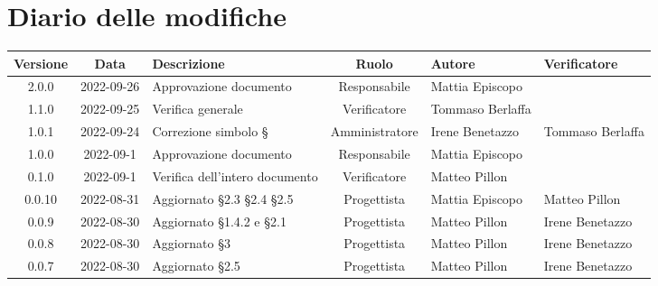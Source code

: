 \section*{Diario delle modifiche}
	\begin{center}
	\renewcommand{\arraystretch}{1.8} %
	\begin{longtable}{ |c|c|p{8em}|c|m{5em}|m{6em}| }
	\hline
	\textbf{Versione} & \textbf{Data} & \textbf{Descrizione} &  \textbf{Ruolo} &  \textbf{Autore} & \textbf{Verificatore}\\ %
	\hline %
	2.0.0 & 2022-09-26 & Approvazione documento & Responsabile & Mattia \newline Episcopo & \\ 
	\hline
	1.1.0 & 2022-09-25 & Verifica generale & Verificatore & Tommaso \newline Berlaffa &\\ 
	\hline
  1.0.1 & 2022-09-24 & Correzione simbolo § & Amministratore & Irene \newline Benetazzo & Tommaso \newline Berlaffa \\ 
	\hline
	1.0.0 & 2022-09-1 & Approvazione documento & Responsabile & Mattia \newline Episcopo & \\ 
	\hline
	0.1.0 & 2022-09-1 & Verifica dell'intero documento & Verificatore & Matteo \newline Pillon & \\ 
	\hline
	0.0.10 & 2022-08-31 & Aggiornato §2.3 §2.4 §2.5 & Progettista & Mattia \newline Episcopo & Matteo \newline Pillon\\ 
	\hline
	0.0.9 & 2022-08-30 & Aggiornato §1.4.2 e §2.1 & Progettista & Matteo \newline Pillon & Irene \newline Benetazzo\\ 
	\hline
	0.0.8 & 2022-08-30 & Aggiornato §3 & Progettista & Matteo \newline Pillon & Irene \newline Benetazzo\\ 
	\hline
	0.0.7 & 2022-08-30 & Aggiornato §2.5 & Progettista & Matteo \newline Pillon & Irene \newline Benetazzo\\ 

\end{longtable}
\end{center}
